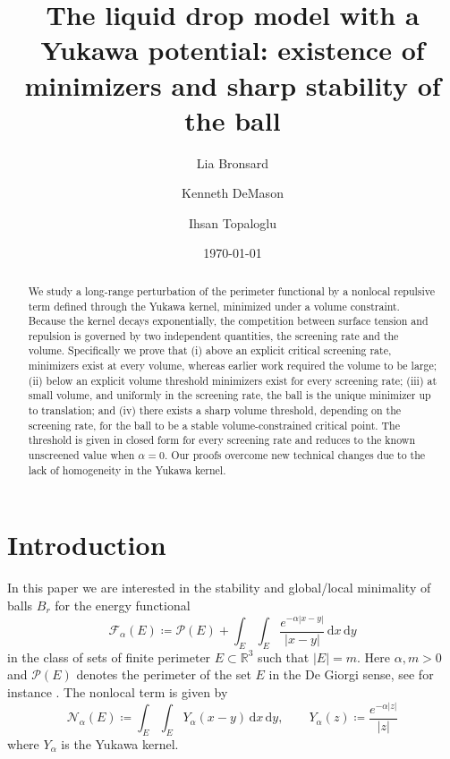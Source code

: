 \documentclass[a4paper,11pt,reqno]{amsart}
\title[The liquid drop model with a Yukawa potential]{The liquid drop model with a Yukawa potential: existence of minimizers and sharp stability of the ball}
\author{Lia Bronsard}
\author{Kenneth DeMason}
\author{Ihsan Topaloglu}
\date{\today}
\numberwithin{equation}{section}
\theoremstyle{remark}
\theoremstyle{definition}
\newcommand{\R}{\mathbb R}
\newcommand{\dd}{\,\mathrm{d}}
\newcommand{\defeq}{\coloneqq}
\newcommand{\enf}{\mathcal{F}_{\alpha}}
\newcommand{\nl}{\mathcal{N}_{\alpha}}
\newcommand{\Pe}{\mathcal{P}}
\begin{document}
\begin{abstract}
We study a long-range perturbation of the perimeter functional by a nonlocal repulsive term defined through the Yukawa kernel, minimized under a volume constraint. Because the kernel decays exponentially, the competition between surface tension and repulsion is governed by two independent quantities, the screening rate and the volume. Specifically we prove that (i) above an explicit critical screening rate, minimizers exist at every volume, whereas earlier work required the volume to be large; (ii) below an explicit volume threshold minimizers exist for every screening rate; (iii) at small volume, and uniformly in the screening rate, the ball is the unique minimizer up to translation; and (iv) there exists a sharp volume threshold, depending on the screening rate, for the ball to be a stable volume-constrained critical point. The threshold is given in closed form for every screening rate and reduces to the known unscreened value when $\alpha=0$. Our proofs overcome new technical changes due to the lack of homogeneity in the Yukawa kernel.
\end{abstract}

\maketitle



\section{Introduction}\label{sec:intro}


In this paper we are interested in the stability and global/local minimality of balls $B_r$ for the energy functional
	\[
		\enf(E) \defeq \Pe(E) + \int_E \int_E \frac{e^{-\alpha|x-y|}}{|x-y|}\dd x \dd y
	\]
in the class of sets of finite perimeter $E\subset \R^3$ such that $|E|=m$. Here $\alpha,m>0$ and $\Pe(E)$ denotes the perimeter of the set $E$ in the De Giorgi sense, see for instance \cite[Chapter 12]{Mag}. The nonlocal term is given by
	\begin{equation}\label{eqn: Nonlocal Definition}
		\nl(E) \defeq \int_E \int_E Y_\alpha(x-y) \dd x \dd y, \qquad  Y_\alpha(z) \defeq \frac{e^{-\alpha|z|}}{|z|}
	\end{equation}
where $Y_{\alpha}$ is the Yukawa kernel.
\end{document}
